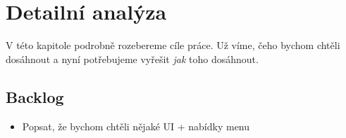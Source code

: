 
\chapter{Detailní analýza}

V této kapitole podrobně rozebereme cíle práce. Už víme, čeho bychom chtěli dosáhnout a nyní potřebujeme vyřešit \textit{jak} toho dosáhnout.



















\section{Backlog}

\begin{itemize}
	
	\item Popsat, že bychom chtěli nějaké UI + nabídky menu

\end{itemize}
